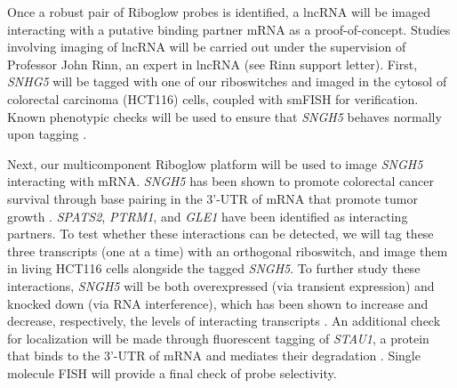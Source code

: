 Once a robust pair of Riboglow probes is identified, a lncRNA will be imaged interacting with a putative binding partner mRNA as a proof-of-concept.
Studies involving imaging of lncRNA will be carried out under the supervision of Professor John Rinn, an expert in lncRNA (see Rinn support letter).
First, \textit{SNHG5} will be tagged with one of our riboswitches and imaged in the cytosol of colorectal carcinoma (HCT116) cells, coupled with smFISH for verification.
Known phenotypic checks will be used to ensure that \textit{SNGH5} behaves normally upon tagging \cite{DamasSNHG5promotescolorectal2016}. %

Next, our multicomponent Riboglow platform will be used to image \textit{SNGH5} interacting with mRNA. \textit{SNGH5} has been shown to promote colorectal cancer survival through base pairing in the 3'-UTR of mRNA that promote tumor growth \cite{DamasSNHG5promotescolorectal2016}.
\textit{SPATS2}, \textit{PTRM1}, and \textit{GLE1} have been identified as interacting partners. To test whether these interactions can be detected, we will tag these three transcripts (one at a time) with an orthogonal riboswitch, and image them in living HCT116 cells alongside the tagged \textit{SNGH5}.
To further study these interactions, \textit{SNGH5} will be both overexpressed (via transient expression) and knocked down (via RNA interference), which has been shown to increase and decrease, respectively, the levels of interacting transcripts \cite{DamasSNHG5promotescolorectal2016}.
An additional check for localization will be made through fluorescent tagging of \textit{STAU1}, a protein that binds to the 3'-UTR of mRNA and mediates their degradation \cite{ParkEonyoungStaufenmediatedmRNA2013}. Single molecule FISH will provide a final check of probe selectivity.



